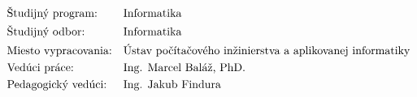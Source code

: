 \thispagestyle{empty}
{\centering
	{\Large \University}\par
	{\Large \Faculty}\par
	\vspace{\medskipamount}
	\RegNo
	\vfill
	\textbf{\large \Author}\par
	\vspace{1.5\bigskipamount}
	\textbf{\Large \Title}\par
	\vspace{1.5\bigskipamount}
	{\large \Thesis}\par
	\vfill
}
\begin{flushleft}
{\setlength{\mathindent}{0.1cm}
\begin{align*}
& \text{Študijný program:} && \text{\StudyProgramme} \\
& \text{Študijný odbor:} && \text{\StudyField} \\
& \text{Miesto vypracovania:} && \text{\Institute} \\
& \text{Vedúci práce:} && \text{\Supervisor} \\
& \text{Pedagogický vedúci:} && \text{\PedagogicalSupervisor}
\end{align*}}
\vspace{2\bigskipamount}
\Date
\end{flushleft}